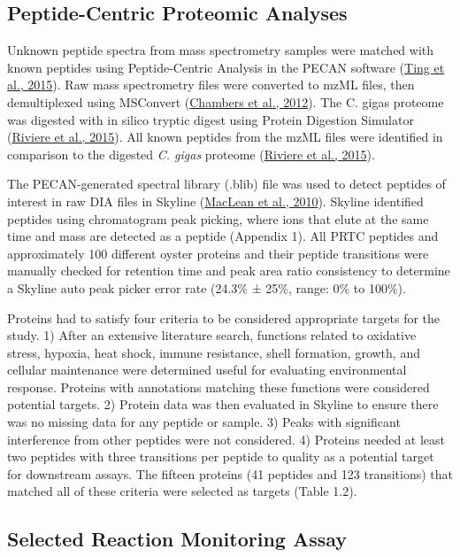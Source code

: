 \documentclass [11pt, proquest] {uwthesis}[2015/03/03]
\begin{document}
\hypertarget{peptide-centric-proteomic-analyses}{%
\subsection{Peptide-Centric Proteomic Analyses}\label{peptide-centric-proteomic-analyses}}

Unknown peptide spectra from mass spectrometry samples were matched with known peptides using Peptide-Centric Analysis in the PECAN software (\protect\hyperlink{ref-Ting2015}{Ting et al., 2015}). Raw mass spectrometry files were converted to mzML files, then demultiplexed using MSConvert (\protect\hyperlink{ref-Chambers2012}{Chambers et al., 2012}). The C. gigas proteome was digested with in silico tryptic digest using Protein Digestion Simulator (\protect\hyperlink{ref-Riviere2015}{Riviere et al., 2015}). All known peptides from the mzML files were identified in comparison to the digested \emph{C. gigas} proteome (\protect\hyperlink{ref-Riviere2015}{Riviere et al., 2015}).

The PECAN-generated spectral library (.blib) file was used to detect peptides of interest in raw DIA files in Skyline (\protect\hyperlink{ref-MacLean2010}{MacLean et al., 2010}). Skyline identified peptides using chromatogram peak picking, where ions that elute at the same time and mass are detected as a peptide (Appendix 1). All PRTC peptides and approximately 100 different oyster proteins and their peptide transitions were manually checked for retention time and peak area ratio consistency to determine a Skyline auto peak picker error rate (24.3\% ± 25\%, range: 0\% to 100\%).

Proteins had to satisfy four criteria to be considered appropriate targets for the study. 1) After an extensive literature search, functions related to oxidative stress, hypoxia, heat shock, immune resistance, shell formation, growth, and cellular maintenance were determined useful for evaluating environmental response. Proteins with annotations matching these functions were considered potential targets. 2) Protein data was then evaluated in Skyline to ensure there was no missing data for any peptide or sample. 3) Peaks with significant interference from other peptides were not considered. 4) Proteins needed at least two peptides with three transitions per peptide to quality as a potential target for downstream assays. The fifteen proteins (41 peptides and 123 transitions) that matched all of these criteria were selected as targets (Table 1.2).

\hypertarget{selected-reaction-monitoring-assay}{%
\subsection{Selected Reaction Monitoring Assay}\label{selected-reaction-monitoring-assay}}
\end{document}
